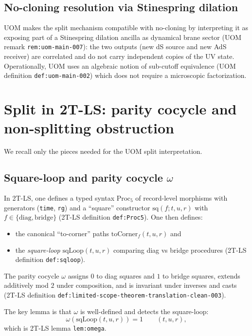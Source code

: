 \documentclass[11pt]{article}
\theoremstyle{definition}
\theoremstyle{plain}
\theoremstyle{remark}
\begin{document}
\subsection{No-cloning resolution via Stinespring dilation}
\label{subsec:no-cloning}

UOM makes the split mechanism compatible with no-cloning by interpreting it as exposing part of a Stinespring dilation
ancilla as dynamical brane sector (UOM remark \texttt{rem:uom-main-007}): the two outputs (new dS source and new AdS
receiver) are correlated and do not carry independent copies of the UV state.
Operationally, UOM uses an algebraic notion of sub-cutoff equivalence (UOM definition \texttt{def:uom-main-002}) which does
not require a microscopic factorization.

\section{Split in 2T-LS: parity cocycle and non-splitting obstruction}
\label{sec:2t-split}

We recall only the pieces needed for the UOM split interpretation.

\subsection{Square-loop and parity cocycle $\omega$}
\label{subsec:omega}

In 2T-LS, one defines a typed syntax $\mathrm{Proc}_5$ of record-level morphisms with generators
(\texttt{time}, \texttt{rg}) and a ``square'' constructor $\mathrm{sq}(f;t,u,r)$ with $f\in\{\mathrm{diag},\mathrm{bridge}\}$
(2T-LS definition \texttt{def:Proc5}). One then defines:
\begin{itemize}[leftmargin=1.6em]
\item the canonical ``to-corner'' paths $\mathrm{toCorner}_f(t,u,r)$ and
\item the \emph{square-loop} $\mathrm{sqLoop}(t,u,r)$ comparing diag vs bridge procedures
(2T-LS definition \texttt{def:sqloop}).
\end{itemize}
The parity cocycle $\omega$ assigns $0$ to diag squares and $1$ to bridge squares, extends additively mod $2$ under
composition, and is invariant under inverses and casts (2T-LS definition
\texttt{def:limited-scope-theorem-translation-clean-003}).

The key lemma is that $\omega$ is well-defined and detects the square-loop:
\begin{equation}
\omega(\mathrm{sqLoop}(t,u,r))=1\qquad (t,u,r),
\label{eq:omega-sqloop}
\end{equation}
which is 2T-LS lemma \texttt{lem:omega}.
\end{document}
